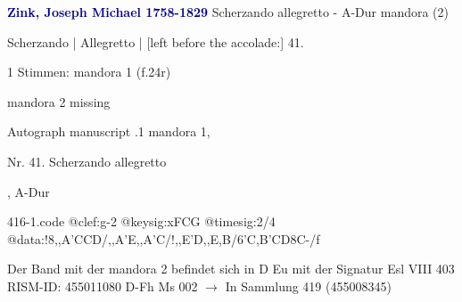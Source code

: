 \documentclass[twocolumn]{book}
\begin{document}
\newline \par \vspace{7pt} \textcolor{darkblue}{\textbf{Zink, Joseph Michael  1758-1829}}
\newline Scherzando allegretto - A-Dur
\newline mandora (2)
\newline \begin{itshape}[f.24r, at left:] Scherzando | Allegretto | [left before the accolade:] 41.\end{itshape} 
\newline \textcolor{darkblue}{}  1 Stimmen: mandora 1  (f.24r)
\newline \begin{small} mandora 2 missing\end{small} 
\newline Autograph manuscript
.1  mandora 1, \begin{itshape}Nr. 41. Scherzando allegretto\end{itshape}, A-Dur  
\begin{filecontents*}{416-1.code}
@clef:g-2
@keysig:xFCG
@timesig:2/4
@data:!8,,A'CCD/,,A'E,,A'C/!,,E'D,,E,B/{6'C,B'CD}8C-/f
\end{filecontents*}
\newline
%
\newline Der Band mit der mandora 2 befindet sich in D Eu mit der Signatur Esl VIII 403
\newline RISM-ID: 455011080
\newline D-Fh  Ms 002
\newline $\rightarrow$ In Sammlung 419 (455008345)
      
\end{document}
